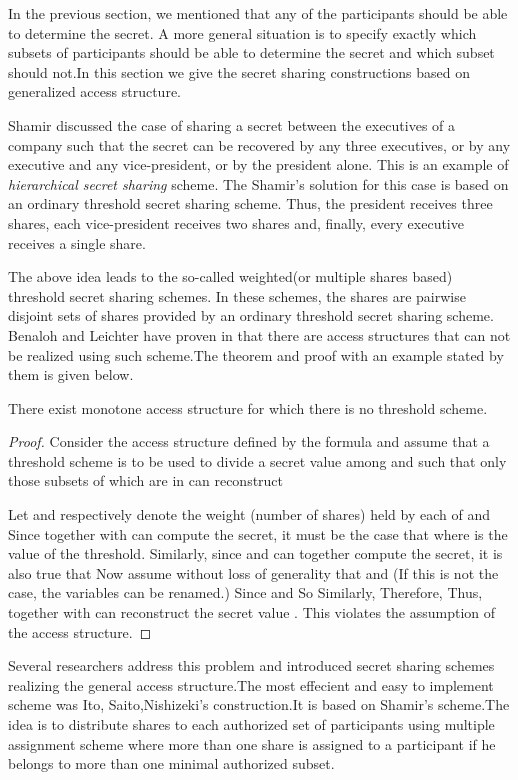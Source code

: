 \documentclass{llncs}
\begin{document}
In the previous section, we mentioned that any   of the  participants should be able to determine the secret. A more general situation is to specify exactly which subsets of participants should be able to determine the secret and which subset should not.In this section we give the secret sharing constructions based on generalized access structure.

Shamir \cite{shamir1979} discussed the case of sharing a secret between the executives of a company such that the secret can be recovered by any three executives, or by any executive and any vice-president, or by the president alone. This is an example of  \textit{hierarchical secret sharing} scheme. The Shamir’s solution for this case is based on an ordinary  threshold secret sharing scheme. Thus, the president receives three shares, each vice-president receives two shares and, finally, every  executive receives a single share.

The above idea leads to the so-called weighted(or multiple shares based) threshold secret sharing schemes. In these schemes, the shares are pairwise disjoint sets of shares provided by an ordinary threshold secret sharing scheme. Benaloh and Leichter have proven in \cite{benaloh1990generalized} that there are access structures that can not be realized using such scheme.The theorem and proof with an example stated by them is given below.
 \begin{theorem}
There exist monotone access structure for which there is no threshold scheme.
\end{theorem}
\begin{proof}
Consider the access structure  defined by the formula  and assume that a threshold scheme is to be used to divide a secret value  among  and  such that only those subsets of  which are in  can reconstruct 
               
Let  and  respectively denote the weight (number of shares) held by each of  and  Since  together with  can compute the secret, it must be the case that  where  is the value of the threshold. Similarly, since  and  can together compute the secret, it is also true that 
 Now assume without loss of generality that  and  (If this is not the case, the variables can be renamed.) Since  and  So  Similarly,  Therefore, 
 Thus,  together with  can reconstruct the secret value . This violates the assumption of the access structure.
\end{proof}

Several researchers address this problem and introduced secret sharing schemes realizing the general access structure.The most effecient and easy to implement scheme was Ito, Saito,Nishizeki's \cite{ito1989secret} construction.It is based on Shamir's scheme.The idea is to  distribute shares to each authorized set of participants using multiple assignment scheme where more than one share is assigned to a participant if he belongs to more than one minimal authorized subset.
\end{document}
